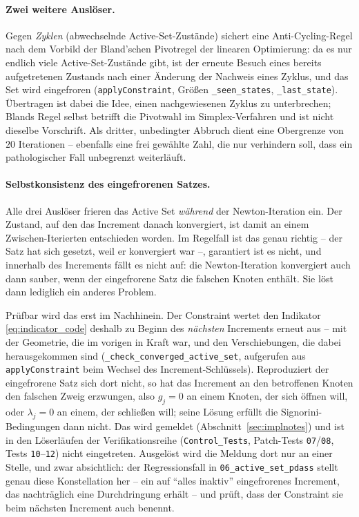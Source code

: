 \documentclass[a4paper,11pt]{article}
\def\tilde#1{#1}%
\newcommand{\code}[1]{\texttt{\small #1}}
\newcommand{\file}[1]{\texttt{\small #1}}
\begin{document}
\paragraph{Zwei weitere Auslöser.}
Gegen \emph{Zyklen} (abwechselnde Active-Set-Zustände) sichert eine Anti-Cycling-Regel nach dem
Vorbild der Bland'schen Pivotregel der linearen Optimierung: da es nur endlich viele
Active-Set-Zustände gibt, ist der erneute Besuch eines bereits aufgetretenen Zustands nach einer
Änderung der Nachweis eines Zyklus, und das Set wird eingefroren (\code{applyConstraint}, Größen
\code{\_seen\_states}, \code{\_last\_state}). Übertragen ist dabei die Idee, einen
nachgewiesenen Zyklus zu unterbrechen; Blands Regel selbst betrifft die Pivotwahl im
Simplex-Verfahren und ist nicht dieselbe Vorschrift. Als dritter, unbedingter Abbruch dient eine
Obergrenze von $20$ Iterationen -- ebenfalls eine frei gewählte Zahl, die nur verhindern soll,
dass ein pathologischer Fall unbegrenzt weiterläuft.

\paragraph{Selbstkonsistenz des eingefrorenen Satzes.}
Alle drei Auslöser frieren das Active Set \emph{während} der Newton-Iteration ein. Der Zustand,
auf den das Increment danach konvergiert, ist damit an einem Zwischen-Iterierten entschieden
worden. Im Regelfall ist das genau richtig -- der Satz hat sich gesetzt, weil er konvergiert war
--, garantiert ist es nicht, und innerhalb des Increments fällt es nicht auf: die Newton-Iteration
konvergiert auch dann sauber, wenn der eingefrorene Satz die falschen Knoten enthält. Sie löst
dann lediglich ein anderes Problem.

Prüfbar wird das erst im Nachhinein. Der Constraint wertet den Indikator
\eqref{eq:indicator_code} deshalb zu Beginn des \emph{nächsten} Increments erneut aus -- mit der
Geometrie, die im vorigen in Kraft war, und den Verschiebungen, die dabei herausgekommen sind
(\code{\_check\_converged\_active\_set}, aufgerufen aus \code{applyConstraint} beim Wechsel des
Increment-Schlüssels). Reproduziert der eingefrorene Satz sich dort nicht, so hat das Increment an
den betroffenen Knoten den falschen Zweig erzwungen, also $\tilde g_j=0$ an einem Knoten, der sich
öffnen will, oder $\lambda_j=0$ an einem, der schließen will; seine Lösung erfüllt die
Signorini-Bedingungen dann nicht. Das wird gemeldet (Abschnitt~\ref{sec:implnotes}) und ist in
den Löserläufen der Verifikationsreihe (\file{Control\_Tests}, Patch-Tests \file{07}/\file{08},
Tests \file{10}--\file{12}) nicht eingetreten. Ausgelöst wird die Meldung dort nur an einer
Stelle, und zwar absichtlich: der Regressionsfall in \file{06\_active\_set\_pdass} stellt genau
diese Konstellation her -- ein auf ``alles inaktiv'' eingefrorenes Increment, das nachträglich
eine Durchdringung erhält -- und prüft, dass der Constraint sie beim nächsten Increment auch
benennt.
\end{document}
